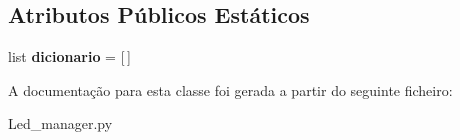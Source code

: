 \subsection*{Atributos Públicos Estáticos}
\begin{DoxyCompactItemize}
\item 
list {\bfseries dicionario} = \mbox{[}$\,$\mbox{]}\hypertarget{class_led__manager_1_1_led_manager_affa9f60bd6b7bf2c29c76f920301e24e}{}\label{class_led__manager_1_1_led_manager_affa9f60bd6b7bf2c29c76f920301e24e}

\end{DoxyCompactItemize}


A documentação para esta classe foi gerada a partir do seguinte ficheiro\+:\begin{DoxyCompactItemize}
\item 
Led\+\_\+manager.\+py\end{DoxyCompactItemize}
